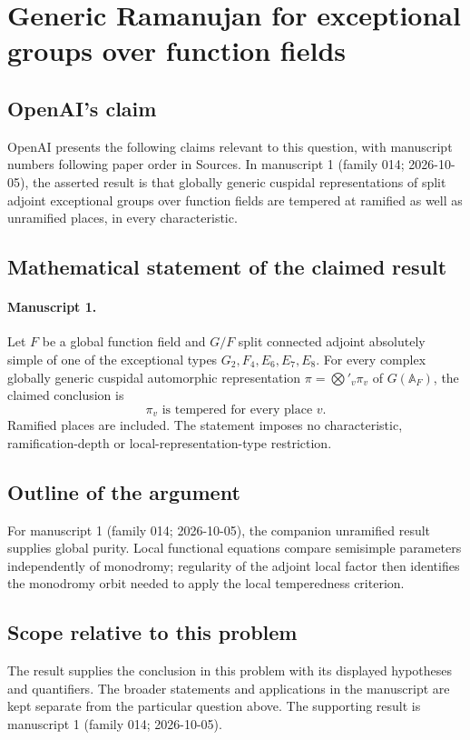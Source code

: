 \documentclass[11pt]{article}
\begin{document}
\section*{Generic Ramanujan for exceptional groups over function fields}

\subsection{OpenAI's claim}
OpenAI presents the following claims relevant to this question, with manuscript numbers following paper order in Sources. In manuscript 1 (family 014; 2026-10-05), the asserted result is that globally generic cuspidal representations of split adjoint exceptional groups over function fields are tempered at ramified as well as unramified places, in every characteristic.

\subsection{Mathematical statement of the claimed result}
\paragraph{Manuscript 1.}
Let $F$ be a global function field and $G/F$ split connected adjoint absolutely simple of one of the exceptional types $G_2,F_4,E_6,E_7,E_8$. For every complex globally generic cuspidal automorphic representation $\pi=\bigotimes'_v\pi_v$ of $G(\mathbb A_F)$, the claimed conclusion is
\[
 \pi_v\text{ is tempered for every place }v.
\]
Ramified places are included. The statement imposes no characteristic, ramification-depth or local-representation-type restriction.

\subsection{Outline of the argument}
For manuscript 1 (family 014; 2026-10-05), the companion unramified result supplies global purity. Local functional equations compare semisimple parameters independently of monodromy; regularity of the adjoint local factor then identifies the monodromy orbit needed to apply the local temperedness criterion.

\subsection{Scope relative to this problem}
The result supplies the conclusion in this problem with its displayed hypotheses and quantifiers. The broader statements and applications in the manuscript are kept separate from the particular question above. The supporting result is manuscript 1 (family 014; 2026-10-05).
\end{document}
